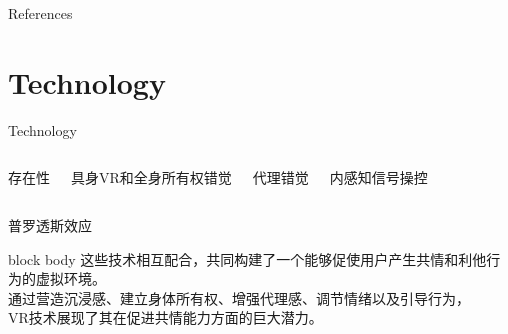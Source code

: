 \documentclass[aspectratio=169,xcolor=dvipsnames]{beamer}
\begin{document}
\begin{frame}{References}
    \footnotesize
    
    
\end{frame}

\section{Technology}
\begin{frame}{Technology}
    \centering
    \vspace{-0.5cm}
    
    \begin{columns}[onlytextwidth,T]
        \begin{block}{\color{white!80!black}存在性 }
 
        \end{block}
        
        \vspace{0.3cm}
        
        \begin{alertblock}{\color{white!70!black}具身VR和全身所有权错觉}

   
        \end{alertblock}
        
        \begin{block}{\color{white!80!black}代理错觉 }

 
        \end{block}
        
        \vspace{0.3cm}
        
        \begin{alertblock}{\color{white!80!black}内感知信号操控}


        \end{alertblock}
    \end{columns}
    
    \vspace{0.5cm}
    
    \begin{block}{\color{white!80!black}普罗透斯效应}
 

    \end{block}
    
    \vspace{0.3cm}
    
    \begin{beamercolorbox}[wd=0.9\textwidth,center,sep=4pt,rounded=true,shadow=true]{block body}
        \footnotesize
        这些技术相互配合，共同构建了一个能够促使用户产生共情和利他行为的虚拟环境。\\
        通过营造沉浸感、建立身体所有权、增强代理感、调节情绪以及引导行为，\\
        VR技术展现了其在促进共情能力方面的巨大潜力。
    \end{beamercolorbox}
\end{frame}
\end{document}
